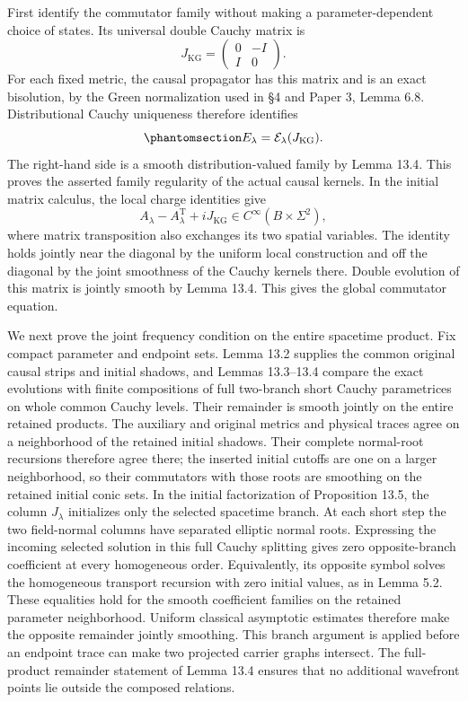 \documentclass[
  english,
  11pt,
  reqno]{amsart}
\begin{document}
First identify the commutator family without making a
parameter-dependent choice of states. Its universal double Cauchy matrix
is \[
J_{\mathrm{KG}}=
\begin{pmatrix}0&-I\\I&0\end{pmatrix}.
\] For each fixed metric, the causal propagator has this matrix and is
an exact bisolution, by the Green normalization used in §4 and Paper 3,
Lemma 6.8. Distributional Cauchy uniqueness therefore identifies
\begin{equation}\protect\phantomsection\label{eq:family-causal-kernel-construction}{
E_\lambda=\mathcal E_\lambda(J_{\mathrm{KG}}).
}\end{equation} The right-hand side is a smooth distribution-valued
family by Lemma 13.4. This proves the asserted family regularity of the
actual causal kernels. In the initial matrix calculus, the local charge
identities give \[
A_\lambda-A_\lambda^{\mathrm T}+iJ_{\mathrm{KG}}
\in C^\infty(B\times\Sigma^2),
\] where matrix transposition also exchanges its two spatial variables.
The identity holds jointly near the diagonal by the uniform local
construction and off the diagonal by the joint smoothness of the Cauchy
kernels there. Double evolution of this matrix is jointly smooth by
Lemma 13.4. This gives the global commutator equation.

We next prove the joint frequency condition on the entire spacetime
product. Fix compact parameter and endpoint sets. Lemma 13.2 supplies
the common original causal strips and initial shadows, and Lemmas
13.3--13.4 compare the exact evolutions with finite compositions of full
two-branch short Cauchy parametrices on whole common Cauchy levels.
Their remainder is smooth jointly on the entire retained products. The
auxiliary and original metrics and physical traces agree on a
neighborhood of the retained initial shadows. Their complete normal-root
recursions therefore agree there; the inserted initial cutoffs are one
on a larger neighborhood, so their commutators with those roots are
smoothing on the retained initial conic sets. In the initial
factorization of Proposition 13.5, the column \(J_\lambda\) initializes
only the selected spacetime branch. At each short step the two
field-normal columns have separated elliptic normal roots. Expressing
the incoming selected solution in this full Cauchy splitting gives zero
opposite-branch coefficient at every homogeneous order. Equivalently,
its opposite symbol solves the homogeneous transport recursion with zero
initial values, as in Lemma 5.2. These equalities hold for the smooth
coefficient families on the retained parameter neighborhood. Uniform
classical asymptotic estimates therefore make the opposite remainder
jointly smoothing. This branch argument is applied before an endpoint
trace can make two projected carrier graphs intersect. The full-product
remainder statement of Lemma 13.4 ensures that no additional wavefront
points lie outside the composed relations.
\end{document}
